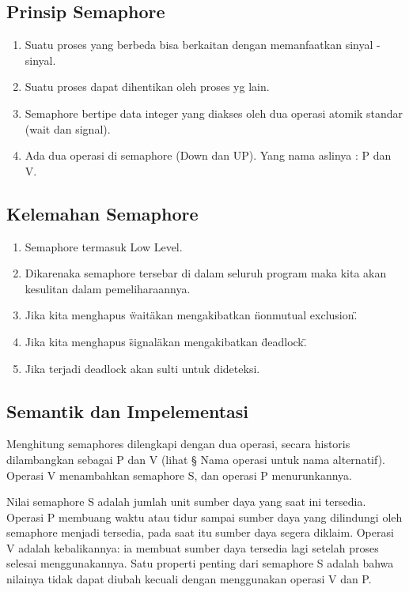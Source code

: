 	\subsection{Prinsip Semaphore}
	
		\begin{enumerate}

			\item Suatu proses yang berbeda bisa berkaitan dengan memanfaatkan sinyal - sinyal.
			\item Suatu proses dapat dihentikan oleh proses yg lain.
			\item Semaphore bertipe data integer yang diakses oleh dua operasi atomik standar (wait dan signal).
			\item Ada dua operasi di semaphore (Down dan UP). Yang nama aslinya : P dan V.
		
		\end{enumerate}

	\subsection{Kelemahan Semaphore}
	
		\begin{enumerate}

			\item Semaphore termasuk Low Level.
			\item Dikarenaka semaphore tersebar di dalam seluruh program maka kita akan kesulitan dalam pemeliharaannya.
			\item Jika kita menghapus \"wait\" akan mengakibatkan \"nonmutual exclusion\".
			\item Jika kita menghapus \"signal\" akan mengakibatkan \"deadlock\".
			\item Jika terjadi deadlock akan sulti untuk dideteksi.

		\end{enumerate}
		
	\subsection{Semantik dan Impelementasi}
		Menghitung semaphores dilengkapi dengan dua operasi, secara historis dilambangkan sebagai P dan V (lihat § Nama operasi untuk nama alternatif). Operasi V menambahkan semaphore S, dan operasi P menurunkannya.

		Nilai semaphore S adalah jumlah unit sumber daya yang saat ini tersedia. Operasi P membuang waktu atau tidur sampai sumber daya yang dilindungi oleh semaphore menjadi tersedia, pada saat itu sumber daya segera diklaim. Operasi V adalah kebalikannya: ia membuat sumber daya tersedia lagi setelah proses selesai menggunakannya. Satu properti penting dari semaphore S adalah bahwa nilainya tidak dapat diubah kecuali dengan menggunakan operasi V dan P.


